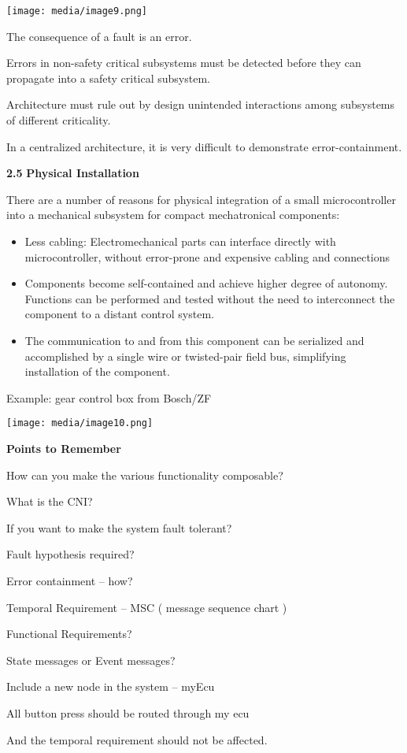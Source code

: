 \texttt{[image: media/image9.png]}

The consequence of a fault is an error.

Errors in non-safety critical subsystems must be detected before they
can propagate into a safety critical subsystem.

Architecture must rule out by design unintended interactions among
subsystems of different criticality.

In a centralized architecture, it is very difficult to demonstrate
error-containment.

\textbf{2.5} \protect\hypertarget{teil6}{}{}\textbf{Physical
Installation}

There are a number of reasons for physical integration of a small
microcontroller into a mechanical subsystem for compact mechatronical
components:

\begin{itemize}
\item
  Less cabling: Electromechanical parts can interface directly with
  microcontroller, without error-prone and expensive cabling and
  connections
\item
  Components become self-contained and achieve higher degree of
  autonomy. Functions can be performed and tested without the need to
  interconnect the component to a distant control system.
\item
  The communication to and from this component can be serialized and
  accomplished by a single wire or twisted-pair field bus, simplifying
  installation of the component.
\end{itemize}

Example: gear control box from Bosch/ZF

\protect\hypertarget{ux5fux5fFieldmarkux5fux5f10ux5f1847268712}{}{}\texttt{[image: media/image10.png]}

\protect\hypertarget{teil8}{}{}\textbf{Points to Remember}

How can you make the various functionality composable?

What is the CNI?

If you want to make the system fault tolerant?

Fault hypothesis required?

Error containment -- how?

Temporal Requirement -- MSC ( message sequence chart )

Functional Requirements?

State messages or Event messages?

Include a new node in the system -- myEcu

All button press should be routed through my ecu

And the temporal requirement should not be affected.
